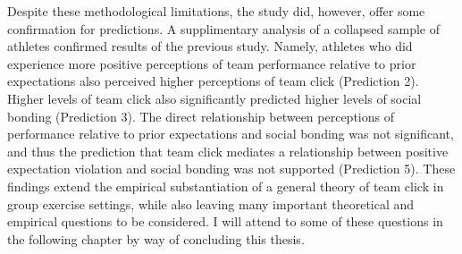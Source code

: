 Despite these methodological limitations, the study did, however, offer some confirmation for predictions.  A supplimentary analysis of a collapsed sample of athletes confirmed results of the previous study.  Namely, athletes who did experience more positive perceptions of team performance relative to prior expectations also perceived higher perceptions of team click (Prediction 2).  Higher levels of team click also significantly predicted higher levels of social bonding (Prediction 3).  The direct relationship between perceptions of performance relative to prior expectations and social bonding was not significant, and thus the prediction that team click mediates a relationship between positive expectation violation and social bonding was not supported (Prediction 5). These findings extend the empirical substantiation of a general theory of team click in group exercise settings, while also leaving many important theoretical and empirical questions to be considered.  I will attend to some of these questions in the following chapter by way of concluding this thesis.
